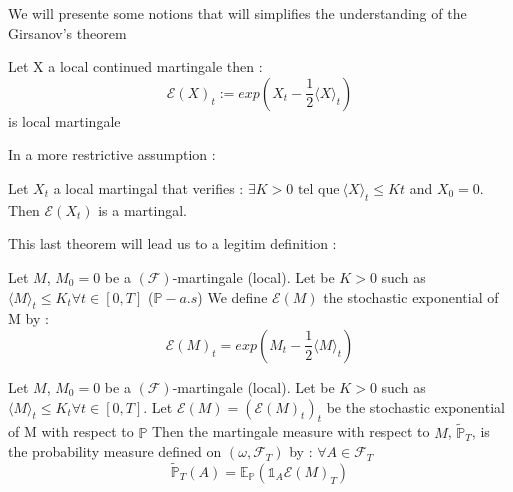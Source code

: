We will  presente some  notions that  will simplifies  the understanding  of the
Girsanov's theorem

\begin{prop}
  Let X a local continued martingale then :
\[
\mathcal{E}(X)_t:=exp(X_t-\frac{1}{2}\langle X \rangle_t )
\]
is local martingale
\end{prop}

In a more restrictive assumption :
\begin{thm}
\label{exp-mrtg:1}
  Let $X_t$ a  local martingal that verifies  : $\exists K > 0  \textrm{ tel que}~\langle  X  \rangle_t  \leq  Kt$  and $X_0=0$. 
	Then $\mathcal{E}(X_t)$  is  a martingal.
\end{thm}

This last theorem will lead us to a legitim definition :
\begin{de}
\label{Stochastic exponential}
Let $M$, $M_{0}=0$ be a $(\mathcal{F})$-martingale (local).
\newline
Let be $K > 0$ such as $\langle M\rangle_{t}\leq K_{t}   \forall t \in [0,T]$ ($\mathbb{P}-a.s$)
\newline
We define $\mathcal{E}(M)$ the stochastic exponential of M by :
\newline
\begin{equation}
\mathcal{E}(M)_{t}=exp\left(M_{t}-\frac{1}{2}\langle M\rangle_{t}\right)
\label{expo}
\end{equation}
\end{de}


\begin{de}
\label{Martingale mesure}
Let $M$, $M_{0}=0$ be a $(\mathcal{F})$-martingale (local).
\newline
Let be $K > 0$ such as $\langle M\rangle_{t}\leq K_{t}   \forall t \in [0,T]$.
\newline
Let $\mathcal{E}(M)=(\mathcal{E}(M)_{t})_{t}$ be the stochastic exponential of M with respect to $\mathbb{P}$
Then the martingale measure with respect to $M$, $\tilde{\mathbb{P}}_{T}$, is the probability measure defined on $(\omega,\mathcal{F}_{T})$ by : $\forall A \in \mathcal{F}_{T}$
\newline
\begin{equation}
\tilde{\mathbb{P}}_{T}(A)=\mathbb{E}_{\mathbb{P}}(\mathds{1}_{A}\mathcal{E}(M)_{T})
\label{ptilde}
\end{equation}

\end{de}


